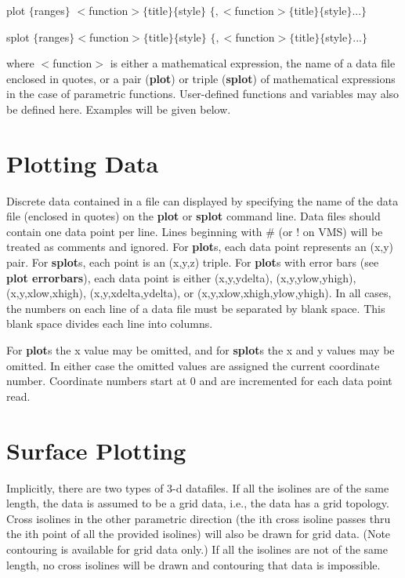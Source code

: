         plot $\{$ranges$\}$ $<$function$> \{$title$\} \{$style$\}$
                    $\{, <$function$> \{$title$\} \{$style$\}...\}$

        splot $\{$ranges$\} <$function$> \{$title$\} \{$style$\}$
                    $\{, <$function$> \{$title$\} \{$style$\}...\}$

where $<$function$>$ is either a mathematical expression, the name of a
data file enclosed in quotes, or a pair ({\bf plot}) or triple ({\bf splot})
of mathematical expressions in the case of parametric functions.
User-defined functions and variables may also be defined here.
Examples will be given below.

\section{Plotting Data}
Discrete data contained in a file can displayed by specifying the
name of the data file (enclosed in quotes) on the {\bf plot} or {\bf splot}
command line. Data files should contain one data point per line.
Lines beginning with \# (or ! on VMS) will be treated as comments
and ignored. For {\bf plot}s, each data point represents an (x,y)
pair. For {\bf splot}s, each point is an (x,y,z) triple. For {\bf plot}s with
error bars (see {\bf plot errorbars}), each data point is either
(x,y,ydelta), (x,y,ylow,yhigh), (x,y,xlow,xhigh), (x,y,xdelta,ydelta), or
(x,y,xlow,xhigh,ylow,yhigh). In all cases, the numbers on each
line of a data file must be separated by blank space. This blank
space divides each line into columns.

For {\bf plot}s the x value may be omitted, and for {\bf splot}s the x
and y values may be omitted. In either case the omitted values are
assigned the current coordinate number. Coordinate numbers start at 0
and are incremented for each data point read.

\section{Surface Plotting}
Implicitly, there are two types of 3-d datafiles. If all the isolines
are of the same length, the data is assumed to be a grid data, i.e.,
the data has a grid topology. Cross isolines in the other parametric
direction (the ith cross isoline passes thru the ith point of all the
provided isolines) will also be drawn for grid data. (Note contouring
is available for grid data only.) If all the isolines are not of the
same length, no cross isolines will be drawn and contouring that data
is impossible.

